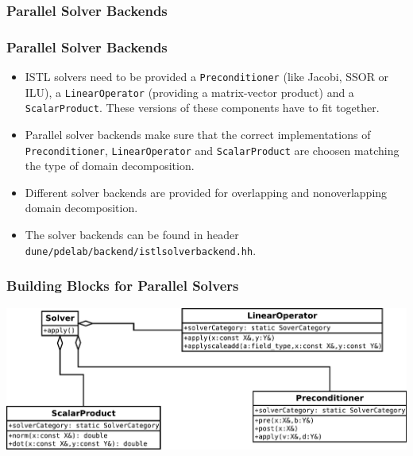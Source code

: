 \subsubsection{Parallel Solver Backends}
\begin{frame}
  \frametitle<presentation>{Parallel Solver Backends}

\begin{itemize}
\item ISTL solvers need to be provided a \lstinline!Preconditioner! (like Jacobi, SSOR or ILU), a 
\lstinline!LinearOperator! (providing a matrix-vector product) and
a \lstinline!ScalarProduct!. These versions of these components have to fit together.
\item Parallel solver backends make sure that the correct implementations of 
\lstinline!Preconditioner!, \lstinline!LinearOperator! and \lstinline!ScalarProduct!
are choosen matching the type of domain decomposition.
\item Different solver backends are provided for overlapping and nonoverlapping domain
decomposition.
\item The solver backends can be found in header \lstinline!dune/pdelab/backend/istlsolverbackend.hh!.
\end{itemize}

\end{frame}

\begin{frame}
  \frametitle<presentation>{Building Blocks for Parallel Solvers}
  \includegraphics[width=\textwidth]{EPS/istlsolver}
\end{frame}


